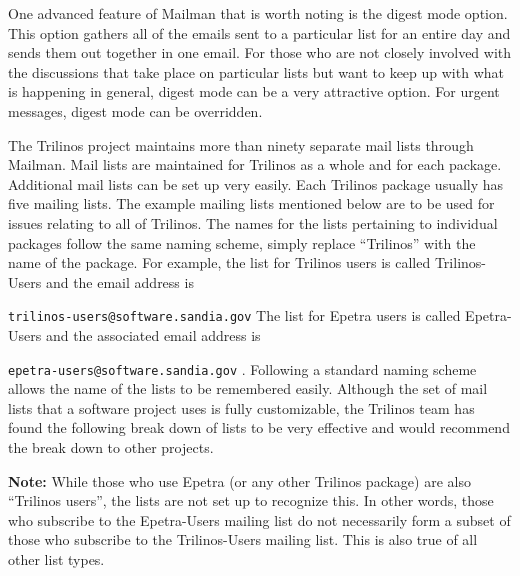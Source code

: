 \documentclass[12pt,relax]{article}
\newcommand{\InlineCommand}[1]{
  {\hspace{0.01 in}} {\tt #1} {\hspace{0.01 in}}}
\begin{document}
One advanced feature of Mailman that is worth noting is the digest mode option.
This option gathers all of the emails sent to a particular list for an entire 
day and sends them out together in one email.  For those who are not closely 
involved with the discussions that take place on particular lists but want to 
keep up with what is happening in general, digest mode can be a very 
attractive option.  For urgent messages, digest mode can 
be overridden.

The Trilinos project maintains more than ninety separate mail lists through 
Mailman.  Mail lists are maintained for Trilinos as a whole and for each 
package.  Additional mail lists can be set up very easily.  Each Trilinos 
package usually has five mailing lists.  The example mailing lists mentioned 
below are to be used for issues relating to all of Trilinos.  
The names for the lists pertaining to individual packages follow the same 
naming scheme, simply replace ``Trilinos'' with the name of the package.  For example, the list for Trilinos users is 
called Trilinos-Users and the email address is 
\InlineCommand{trilinos-users@software.sandia.gov}  The list 
for Epetra users is called Epetra-Users and the associated email address is 
\InlineCommand{epetra-users@software.sandia.gov}.  Following a standard naming
scheme allows the name of the lists to be remembered easily.  Although the 
set of mail lists that a software project uses is fully customizable, the 
Trilinos team has found the following break down of lists to be very effective 
and would recommend the break down to other projects.

{\bf Note:}
While those who use Epetra (or any other Trilinos package) are also
``Trilinos users'', the lists are not set up to recognize this.  In other 
words, those who subscribe to the Epetra-Users mailing list do not necessarily 
form a subset of those who subscribe to the Trilinos-Users mailing list.  This 
is also true of all other list types.  
\end{document}

